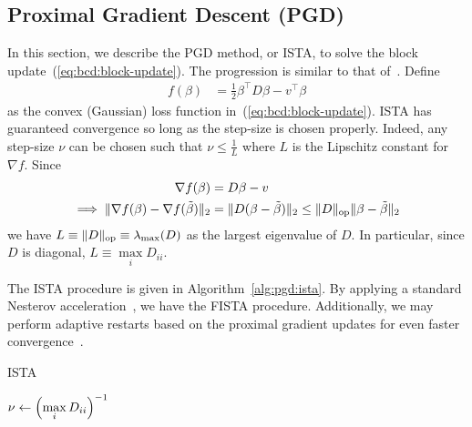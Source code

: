 \subsection{Proximal Gradient Descent (PGD)}\label{ssec:pgd}

In this section, we describe the PGD method, or ISTA,
to solve the block update~(\ref{eq:bcd:block-update}).
The progression is similar to that of~\citet{sls:2016}.
Define
\begin{align*}
    f(\beta)
    &=
    \frac{1}{2} \beta^\top D \beta
    - v^\top \beta
\end{align*}
as the convex (Gaussian) loss function in~(\ref{eq:bcd:block-update}).
ISTA has guaranteed convergence so long as the step-size is chosen properly.
Indeed, any step-size $\nu$ can be chosen such that
$\nu \leq \frac{1}{L}$ where $L$ is the Lipschitz constant for $\nabla f$.
Since 
\begin{align}
    \nabla f(\beta)
    &=
    D \beta - v
    \label{eq:pgd:nablaf}
    \\\implies
    \|
        \nabla f(\beta)
        - \nabla f(\tilde{\beta})
    \|_2
    &=
    \|D (\beta - \tilde{\beta})\|_2
    \leq
    \|D\|_{\text{op}} \|\beta-\tilde{\beta}\|_2
    \nonumber
\end{align}
we have $L \equiv \|D\|_{\text{op}} \equiv \lambda_{\max}(D)$ as the largest eigenvalue of $D$.
In particular, since $D$ is diagonal, $L \equiv \max\limits_{i} D_{ii}$.

The ISTA procedure is given in Algorithm~\ref{alg:pgd:ista}.
By applying a standard Nesterov acceleration~\citep{beck:2009}, 
we have the FISTA procedure. %
Additionally, we may perform adaptive restarts
based on the proximal gradient updates
for even faster convergence~\citep{odonoghue:2015}. %

\begin{algorithm}[t]
    \caption{ISTA}\label{alg:pgd:ista}
    $\nu \gets \left(\max\limits_{i} D_{ii}\right)^{-1}$\;
\end{algorithm}

